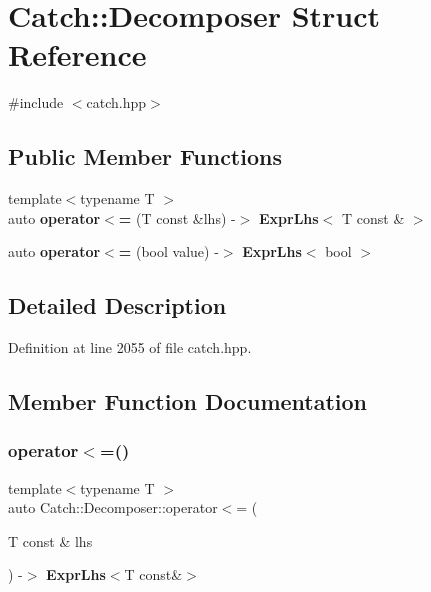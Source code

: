 \section{Catch\+::Decomposer Struct Reference}
\label{struct_catch_1_1_decomposer}


{\ttfamily \#include $<$catch.\+hpp$>$}

\subsection*{Public Member Functions}
\begin{DoxyCompactItemize}
\item 
{\footnotesize template$<$typename T $>$ }\\auto \textbf{ operator$<$=} (T const \&lhs) -\/$>$ \textbf{ Expr\+Lhs}$<$ T const \& $>$
\item 
auto \textbf{ operator$<$=} (bool value) -\/$>$ \textbf{ Expr\+Lhs}$<$ bool $>$
\end{DoxyCompactItemize}


\subsection{Detailed Description}


Definition at line 2055 of file catch.\+hpp.



\subsection{Member Function Documentation}
\mbox{\label{struct_catch_1_1_decomposer_a4b1e5e844c20e5a90e3d759d216674cd}} 
\subsubsection{operator$<$=()\hspace{0.1cm}{\footnotesize\ttfamily [1/2]}}
{\footnotesize\ttfamily template$<$typename T $>$ \\
auto Catch\+::\+Decomposer\+::operator$<$= (\begin{DoxyParamCaption}\item[{T const \&}]{lhs }\end{DoxyParamCaption}) -\/$>$ \textbf{ Expr\+Lhs}$<$T const\&$>$ \hspace{0.3cm}{\ttfamily [inline]}}




